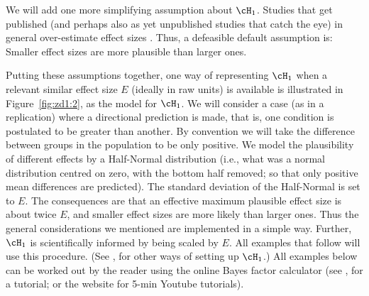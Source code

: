 We will add one more simplifying assumption about $\cH_1$. Studies that get published (and perhaps also as yet unpublished studies that catch the eye) in general over-estimate effect sizes \cite{Ioannides2008,OSC2015}. Thus, a defeasible default assumption is: Smaller effect sizes are more plausible than larger ones.

Putting these assumptions together, one way of representing $\cH_1$ when a relevant similar effect size $E$ (ideally in raw units) is available is illustrated in Figure~\ref{fig:zd1:2}, as the model for $\cH_1$.  We will consider a case (as in a replication) where a directional prediction is made, that is, one condition is postulated to be greater than another. By convention we will take the difference between groups in the population to be only positive. We model the plausibility of different effects by a Half-Normal distribution (i.e., what was a normal distribution centred on zero, with the bottom half removed; so that only positive mean differences are predicted). The standard deviation of the Half-Normal is set to $E$. The consequences are that an effective maximum plausible effect size is about twice $E$, and smaller effect sizes are more likely than larger ones. Thus the general considerations we mentioned are implemented in a simple way. Further, $\cH_1$ is scientifically informed by being scaled by $E$. All examples that follow will use this procedure. (See , for other ways of setting up $\cH_1$.) All examples below can be worked out by the reader using the  online Bayes factor calculator (see , for a tutorial; or the  website for 5-min Youtube tutorials).

